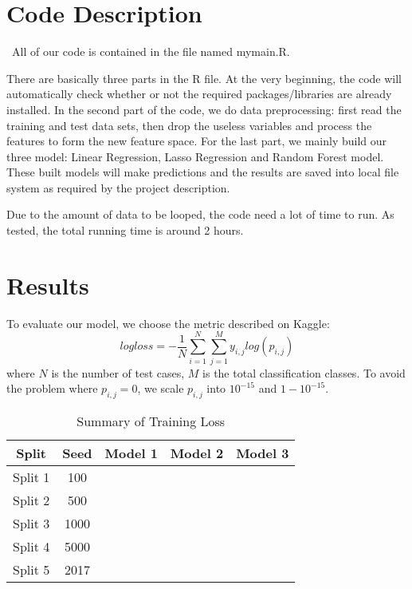 \documentclass[12pt]{article}
\begin{document}
\section{Code Description}
\quad\ All of our code is contained in the file named mymain.R. 


There are basically three parts in the R file. At the very beginning, the code will automatically check whether or not the required packages/libraries are already installed. In the second part of the code, we do data preprocessing: first read the training and test data sets, then drop the useless variables and process the features to form the new feature space. For the last part, we mainly build our three model: Linear Regression, Lasso Regression and Random Forest model. These built models will make predictions and the results are saved into local file system as required by the project description.

Due to the amount of data to be looped, the code need a lot of time to run. As tested, the total running time is around 2 hours.

\section{Results}

To evaluate our model, we choose the metric described on Kaggle:
\begin{equation}
logloss = - \frac{1}{N} \sum_{i=1}^N \sum_{j=1}^M y_{i, j} log(p_{i, j})
\end{equation}
where $N$ is the number of test cases, $M$ is the total classification classes. To avoid the problem where $p_{i, j} = 0$, we scale $p_{i, j}$ into $10 ^ {-15}$ and $1 - 10 ^ {-15}$.


\begin{table}[htb]
 \caption{Summary of Training Loss} \label{result}
 \vspace{0.1in}
\begin{center}
  \begin{tabular}{  c  c  c  c  c}
    \hline
    Split            & Seed        & Model 1    & Model 2    & Model 3 \\ \hline
    Split 1         & 100    \\ \hline
    Split 2         & 500    \\ \hline
    Split 3         & 1000    \\ \hline
    Split 4         & 5000    \\ \hline
    Split 5         & 2017    \\ \hline
  \end{tabular}
\end{center}
\end{table}
\end{document}
